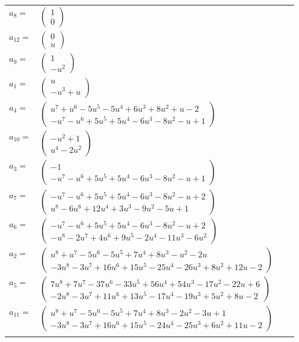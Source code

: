 \documentclass[1p]{elsarticle_modified}
\theoremstyle{definition}
\begin{document}
\begin{tabular}{m{7pt} m{180pt} m{7pt} m{180pt} }
\flushright $a_{8}=$&$\begin{pmatrix}1\\0\end{pmatrix}$ \\
\flushright $a_{12}=$&$\begin{pmatrix}0\\u\end{pmatrix}$ \\
\flushright $a_{9}=$&$\begin{pmatrix}1\\- u^2\end{pmatrix}$ \\
\flushright $a_{1}=$&$\begin{pmatrix}u\\- u^3+u\end{pmatrix}$ \\
\flushright $a_{4}=$&$\begin{pmatrix}u^7+u^6-5 u^5-5 u^4+6 u^3+8 u^2+u-2\\- u^7- u^6+5 u^5+5 u^4-6 u^3-8 u^2- u+1\end{pmatrix}$ \\
\flushright $a_{10}=$&$\begin{pmatrix}- u^2+1\\u^4-2 u^2\end{pmatrix}$ \\
\flushright $a_{3}=$&$\begin{pmatrix}-1\\- u^7- u^6+5 u^5+5 u^4-6 u^3-8 u^2- u+1\end{pmatrix}$ \\
\flushright $a_{7}=$&$\begin{pmatrix}- u^7- u^6+5 u^5+5 u^4-6 u^3-8 u^2- u+2\\u^8-6 u^6+12 u^4+3 u^3-9 u^2-5 u+1\end{pmatrix}$ \\
\flushright $a_{6}=$&$\begin{pmatrix}- u^7- u^6+5 u^5+5 u^4-6 u^3-8 u^2- u+2\\- u^8-2 u^7+4 u^6+9 u^5-2 u^4-11 u^3-6 u^2\end{pmatrix}$ \\
\flushright $a_{2}=$&$\begin{pmatrix}u^8+u^7-5 u^6-5 u^5+7 u^4+8 u^3- u^2-2 u\\-3 u^8-3 u^7+16 u^6+15 u^5-25 u^4-26 u^3+8 u^2+12 u-2\end{pmatrix}$ \\
\flushright $a_{5}=$&$\begin{pmatrix}7 u^8+7 u^7-37 u^6-33 u^5+56 u^4+54 u^3-17 u^2-22 u+6\\-2 u^8-3 u^7+11 u^6+13 u^5-17 u^4-19 u^3+5 u^2+8 u-2\end{pmatrix}$ \\
\flushright $a_{11}=$&$\begin{pmatrix}u^8+u^7-5 u^6-5 u^5+7 u^4+8 u^3-2 u^2-3 u+1\\-3 u^8-3 u^7+16 u^6+15 u^5-24 u^4-25 u^3+6 u^2+11 u-2\end{pmatrix}$\\&\end{tabular}
\end{document}
